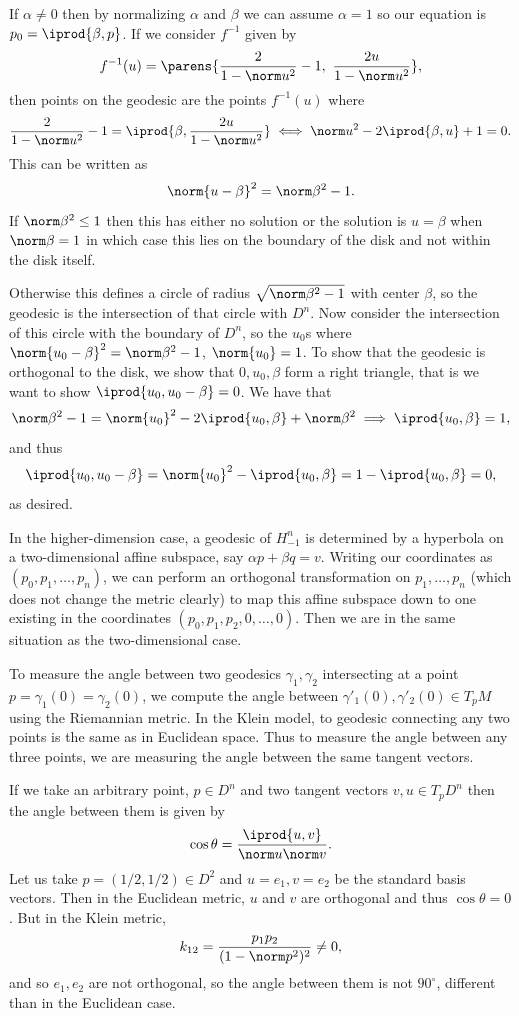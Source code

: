     If $\alpha\neq0$ then by normalizing $\alpha$ and $\beta$ we can assume $\alpha=1$ so our equation is $p_0=\iprod{\beta,p}$.
    If we consider $f^{-1}$ given by
    $$ f^{-1}(u) = \parens{\frac2{1-\norm u^2}-1,\ \frac{2u}{1-\norm u^2}} , $$
    then points on the geodesic are the points $f^{-1}(u)$ where
    $$ \frac2{1-\norm u^2}-1 = \iprod{\beta,\frac{2u}{1-\norm u^2}} \iff \norm u^2 - 2\iprod{\beta,u} + 1 = 0 . $$
    This can be written as
    $$ \norm{u-\beta}^2 = \norm\beta^2 - 1 . $$
    If $\norm\beta^2\leq1$ then this has either no solution or the solution is $u=\beta$ when $\norm\beta=1$ in which case this lies on the boundary of the disk and not within the disk
    itself.

    Otherwise this defines a circle of radius $\sqrt{\norm\beta^2-1}$ with center $\beta$, so the geodesic is the intersection of that circle with $D^n$.
    Now consider the intersection of this circle with the boundary of $D^n$, so the $u_0$s where $\norm{u_0-\beta}^2=\norm\beta^2-1$, $\norm{u_0}=1$.
    To show that the geodesic is orthogonal to the disk, we show that $0,u_0,\beta$ form a right triangle, that is we want to show $\iprod{u_0,u_0-\beta}=0$.
    We have that 
    $$ \norm\beta^2 - 1 = \norm{u_0}^2 - 2\iprod{u_0,\beta} + \norm\beta^2 \implies \iprod{u_0,\beta} = 1 , $$
    and thus
    $$ \iprod{u_0,u_0-\beta} = \norm{u_0}^2 - \iprod{u_0,\beta} = 1 - \iprod{u_0,\beta} = 0 , $$
    as desired.

    In the higher-dimension case, a geodesic of $H^n_{-1}$ is determined by a hyperbola on a two-dimensional affine subspace, say $\alpha p+\beta q=v$.
    Writing our coordinates as $(p_0,p_1,\dots,p_n)$, we can perform an orthogonal transformation on $p_1,\dots,p_n$ (which does not change the metric clearly) to map this
    affine subspace down to one existing in the coordinates $(p_0,p_1,p_2,0,\dots,0)$.
    Then we are in the same situation as the two-dimensional case.

    \item To measure the angle between two geodesics $\gamma_1,\gamma_2$ intersecting at a point $p=\gamma_1(0)=\gamma_2(0)$, we compute the angle between
    $\gamma'_1(0),\gamma'_2(0)\in T_pM$ using the Riemannian metric.
    In the Klein model, to geodesic connecting any two points is the same as in Euclidean space.
    Thus to measure the angle between any three points, we are measuring the angle between the same tangent vectors.

    If we take an arbitrary point, $p\in D^n$ and two tangent vectors $v,u\in T_pD^n$ then the angle between them is given by
    $$ \cos\theta = \frac{\iprod{u,v}}{\norm u\norm v} . $$
    Let us take $p=(1/2,1/2)\in D^2$ and $u=e_1,v=e_2$ be the standard basis vectors.
    Then in the Euclidean metric, $u$ and $v$ are orthogonal and thus $\cos\theta=0$.
    But in the Klein metric,
    $$ k_{12} = \frac{p_1p_2}{(1-\norm p^2)^2} \neq 0 , $$
    and so $e_1,e_2$ are not orthogonal, so the angle between them is not $90^\circ$, different than in the Euclidean case.
\eenum

